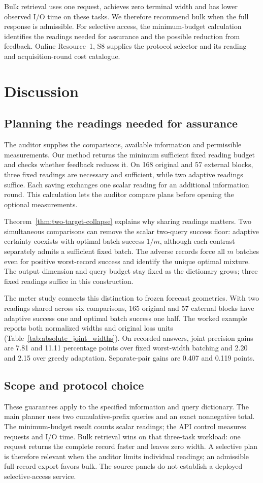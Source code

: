 \documentclass[12pt]{article}
\begin{document}
Bulk retrieval uses one request, achieves zero terminal width and has
lower observed I/O time on these tasks. We therefore recommend bulk when
the full response is admissible. For selective access, the minimum-budget
calculation identifies the readings needed for assurance and the possible
reduction from feedback. Online Resource~1, S8 supplies the protocol selector
and its reading and acquisition-round cost catalogue.
\section{Discussion}
\subsection{Planning the readings needed for assurance}
The auditor supplies the comparisons, available information and permissible
measurements. Our method returns the minimum sufficient fixed reading budget
and checks whether feedback reduces it. On 168 original and 57 external
blocks, three fixed readings are necessary and sufficient, while two adaptive
readings suffice. Each saving exchanges one scalar reading for an additional
information round. This calculation lets the auditor compare plans before
opening the optional measurements.

Theorem~\ref{thm:two-target-collapse} explains why sharing readings matters.
Two simultaneous comparisons can remove the scalar two-query success floor:
adaptive certainty coexists with optimal batch success $1/m$, although each
contrast separately admits a sufficient fixed batch. The adverse records
force all $m$ batches even for positive worst-record success and identify the
unique optimal mixture. The output dimension and query budget stay fixed as
the dictionary grows; three fixed readings suffice in this construction.

The meter study connects this distinction to frozen forecast geometries.
With two readings shared across six comparisons, 165 original and 57
external blocks have adaptive success one and optimal batch success one
half. The worked example reports both normalized widths and original loss
units (Table~\ref{tab:absolute_joint_widths}). On recorded answers, joint
precision gains are 7.81 and 11.11 percentage points over fixed worst-width
batching and 2.20 and 2.15 over greedy adaptation. Separate-pair gains are
0.407 and 0.119 points.

\subsection{Scope and protocol choice}
These guarantees apply to the specified information and query dictionary.
The main planner uses two cumulative-prefix queries and an exact
nonnegative total. The minimum-budget result counts scalar readings;
the API control measures requests and I/O time. Bulk retrieval wins on that
three-task workload: one request returns the complete record faster and
leaves zero width. A selective plan is therefore relevant when the auditor
limits individual readings; an admissible full-record export favors bulk.
The source panels do not establish a deployed selective-access service.
\end{document}
